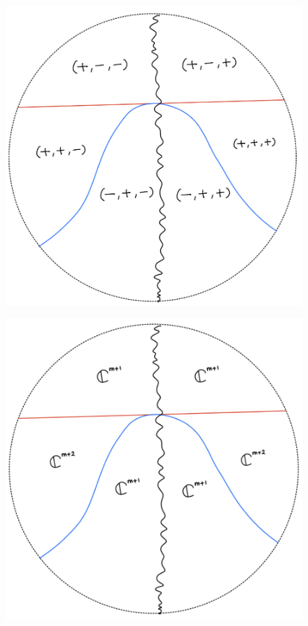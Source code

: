 \begin{figure}[H]
    \centering
    \includegraphics[scale = 0.45]{diagrams/lemma3/24.png} 
    \caption{}
    \label{fig:your-label}
\end{figure}
\begin{figure}[H]
    \centering
    \includegraphics[scale = 0.45]{diagrams/lemma3/25.png} 
    \caption{}
    \label{fig:your-label}
\end{figure}
